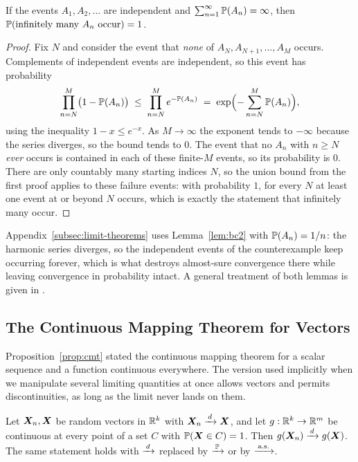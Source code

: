 \begin{lemma}\label{lem:bc2}
If the events \(A_1, A_2, \dots\) are independent and \(\sum_{n=1}^\infty \mathbb{P}(A_n) = \infty\), then
\(\mathbb{P}(\text{infinitely many } A_n \text{ occur}) = 1\).
\end{lemma}

\begin{proof}
Fix \(N\) and consider the event that \emph{none} of \(A_N, A_{N+1}, \dots, A_M\) occurs. Complements of independent events are independent, so this event has probability
\[
  \prod_{n = N}^{M} \bigl(1 - \mathbb{P}(A_n)\bigr)
  \;\le\; \prod_{n = N}^{M} e^{-\mathbb{P}(A_n)}
  \;=\; \exp\Bigl(-\sum_{n = N}^{M} \mathbb{P}(A_n)\Bigr),
\]
using the inequality \(1 - x \le e^{-x}\). As \(M \to \infty\) the exponent tends to \(-\infty\) because the series diverges, so the bound tends to \(0\). The event that no \(A_n\) with \(n \ge N\) \emph{ever} occurs is contained in each of these finite-\(M\) events, so its probability is \(0\). There are only countably many starting indices \(N\), so the union bound from the first proof applies to these failure events: with probability \(1\), for every \(N\) at least one event at or beyond \(N\) occurs, which is exactly the statement that infinitely many occur.
\end{proof}

Appendix~\ref{subsec:limit-theorems} uses Lemma~\ref{lem:bc2} with \(\mathbb{P}(A_n) = 1/n\): the harmonic series diverges, so the independent events of the counterexample keep occurring forever, which is what destroys almost-sure convergence there while leaving convergence in probability intact. A general treatment of both lemmas is given in \citet[\S 4]{Billingsley1995}.

\subsection{The Continuous Mapping Theorem for Vectors}\label{app:cmt-vectors}

Proposition~\ref{prop:cmt} stated the continuous mapping theorem for a scalar sequence and a function continuous everywhere. The version used implicitly when we manipulate several limiting quantities at once allows vectors and permits discontinuities, as long as the limit never lands on them.

\begin{theorem}\label{thm:cmt-general}
Let \(\bm{X}_n, \bm{X}\) be random vectors in \(\mathbb{R}^k\) with \(\bm{X}_n \xrightarrow{\,d\,} \bm{X}\), and let \(g: \mathbb{R}^k \to \mathbb{R}^m\) be continuous at every point of a set \(C\) with \(\mathbb{P}(\bm{X} \in C) = 1\). Then \(g(\bm{X}_n) \xrightarrow{\,d\,} g(\bm{X})\). The same statement holds with \(\xrightarrow{\,d\,}\) replaced by \(\xrightarrow{\,\mathbb{P}\,}\) or by \(\xrightarrow{\,\text{a.s.}\,}\).
\end{theorem}

